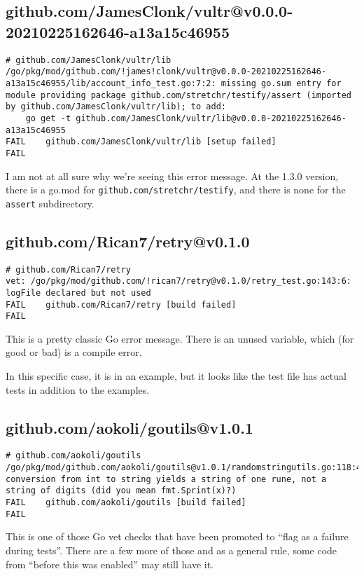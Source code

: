 \subsection{github.com/JamesClonk/vultr@v0.0.0-20210225162646-a13a15c46955}
\begin{verbatim}
# github.com/JamesClonk/vultr/lib
/go/pkg/mod/github.com/!james!clonk/vultr@v0.0.0-20210225162646-a13a15c46955/lib/account_info_test.go:7:2: missing go.sum entry for module providing package github.com/stretchr/testify/assert (imported by github.com/JamesClonk/vultr/lib); to add:
	go get -t github.com/JamesClonk/vultr/lib@v0.0.0-20210225162646-a13a15c46955
FAIL	github.com/JamesClonk/vultr/lib [setup failed]
FAIL

\end{verbatim}

I am not at all sure why we're seeing this error message. At the 1.3.0
version, there is a go.mod for {\tt github.com/stretchr/testify}, and
there is none for the {\tt assert} subdirectory.

\subsection{github.com/Rican7/retry@v0.1.0}
\begin{verbatim}
# github.com/Rican7/retry
vet: /go/pkg/mod/github.com/!rican7/retry@v0.1.0/retry_test.go:143:6: logFile declared but not used
FAIL	github.com/Rican7/retry [build failed]
FAIL
\end{verbatim}

This is a pretty classic Go error message. There is an unused
variable, which (for good or bad) is a compile error.

In this specific case, it is in an example, but it looks like the test
file has actual tests in addition to the examples.

\subsection{github.com/aokoli/goutils@v1.0.1}
\begin{verbatim}
# github.com/aokoli/goutils
/go/pkg/mod/github.com/aokoli/goutils@v1.0.1/randomstringutils.go:118:44: conversion from int to string yields a string of one rune, not a string of digits (did you mean fmt.Sprint(x)?)
FAIL	github.com/aokoli/goutils [build failed]
FAIL
\end{verbatim}

This is one of those Go vet checks that have been promoted to ``flag
as a failure during tests''. There are a few more of those and as a
general rule, some code from ``before this was enabled'' may still
have it.

